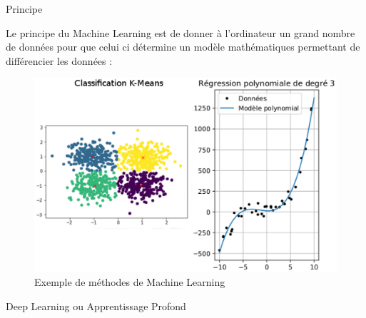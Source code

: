 \documentclass{book}
\newcommand{\p}{\vspace{0.2cm}}
\begin{document}
	\begin{chapter}{Principe}

		Le principe du Machine Learning est de donner à l'ordinateur un grand nombre de données pour que celui ci détermine un modèle mathématiques permettant de différencier les données :
		\begin{figure}
			\begin{center}
				\includegraphics[scale = 0.8]{annex/ex_mach_lr}
				\caption{Exemple de méthodes de Machine Learning}
				\label{example}
			\end{center}
		\end{figure}\p

		\begin{section}{Deep Learning ou Apprentissage Profond}


\end{section}
\end{chapter}
\end{document}

